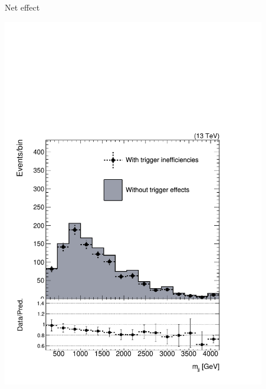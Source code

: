 \documentclass[aspectratio=169,xcolor=dvipsnames,,table,compress]{beamer}
\begin{document}
\begin{frame}
\begin{columns}[T]
\begin{column}{0.33\textwidth}
    \end{column}
    \pause 
    \begin{column}{0.33\textwidth}
      \centering 
      Net effect
      \begin{itemize}
      \end{itemize}
      \includegraphics[width=0.9\textwidth]{../figures/vbf/triggers/mjjsignal_jot12Mass.pdf}
    \end{column}
  \end{columns}
\end{frame}
\end{document}
